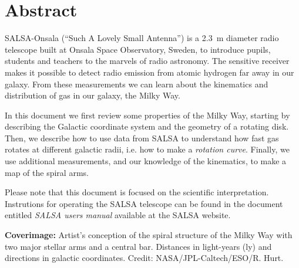 \chapter*{Abstract}
SALSA-Onsala (``Such A Lovely Small Antenna'') is a 2.3~m diameter radio
telescope built at Onsala Space Observatory, Sweden, to introduce pupils,
students and teachers to the marvels of radio astronomy.  The sensitive
receiver makes it possible to detect radio emission from atomic hydrogen far
away in our galaxy. From these measurements we can learn about the kinematics
and distribution of gas in our galaxy, the Milky Way. 

In this document we first review some properties of the Milky Way, starting by
describing the Galactic coordinate system and the geometry of a rotating disk.
Then, we describe how to use data from SALSA to understand how fast gas rotates
at different galactic radii, i.e. how to make a \emph{rotation curve}. Finally,
we use additional measurements, and our knowledge of the kinematics, to make a
map of the spiral arms.

Please note that this document is focused on the scientific interpretation. 
Instrutions for operating the SALSA telescope can be found in the document
entitled \emph{SALSA users manual} available at the SALSA website.


\vspace{9cm}




{\bf Coverimage:} Artist's conception of the spiral structure of the
Milky Way with two major stellar arms and a central bar. Distances in
light-years (ly) and directions in galactic coordinates. Credit:
NASA/JPL-Caltech/ESO/R. Hurt.
